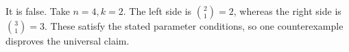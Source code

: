 It is false. Take $n=4,k=2$. The left side is $\binom21=2$, whereas the right side is $\binom31=3$. These satisfy the stated parameter conditions, so one counterexample disproves the universal claim.
